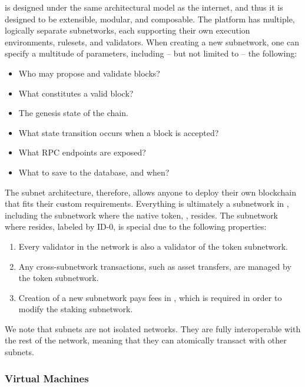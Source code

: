 \documentclass[runningheads]{llncs}
\begin{document}
\AVAPlatformName{} is designed under the same architectural model as the internet, and thus it is designed to be extensible, modular, and composable. The \AVAPlatformName{} platform has multiple, logically separate subnetworks, each supporting their own execution environments, rulesets, and validators. When creating a new subnetwork, one can specify a multitude of parameters, including -- but not limited to -- the following:
\begin{itemize}
\item{} Who may propose and validate blocks?
\item{} What constitutes a valid block?
\item{} The genesis state of the chain.
\item{} What state transition occurs when a block is accepted?
\item{} What RPC endpoints are exposed?
\item{} What to save to the database, and when?
\end{itemize}
The subnet architecture, therefore, allows anyone to deploy their own blockchain that fits their custom requirements. Everything is ultimately a subnetwork in \AVAPlatformName{}, including the subnetwork where the native token, \AVATokenName{}, resides. The subnetwork where \AVATokenName{} resides, labeled by ID-0, is special due to the following properties:
\begin{enumerate}
\item Every validator in the \AVAPlatformName{} network is also a validator of the \AVATokenName{} token subnetwork.
\item Any cross-subnetwork transactions, such as asset transfers, are managed by the \AVATokenName{} token subnetwork.
\item Creation of a new subnetwork pays fees in \AVATokenName{}, which is required in order to modify the staking subnetwork. 
\end{enumerate}
We note that subnets are not isolated networks. They are fully interoperable with the rest of the network, meaning that they can atomically transact with other subnets. 

\subsubsection{Virtual Machines}
\end{document}

